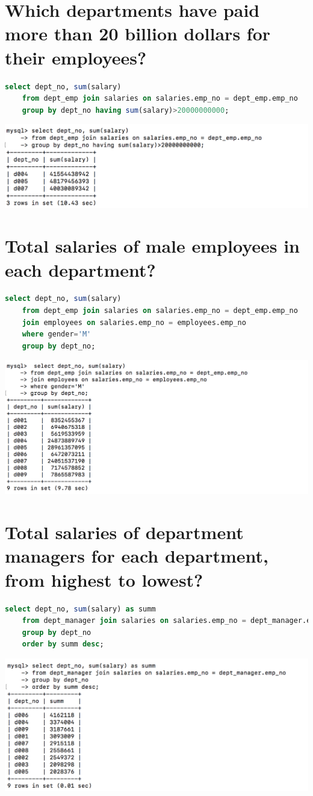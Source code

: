 \documentclass{article}
\begin{document}
\section{Which departments have paid more than 20 billion dollars for their employees?}
\begin{lstlisting}[language=sql]
select dept_no, sum(salary) 
	from dept_emp join salaries on salaries.emp_no = dept_emp.emp_no
	group by dept_no having sum(salary)>20000000000;
\end{lstlisting}
\includegraphics[width=\linewidth]{4.png}

\section{Total salaries of male employees in each department?}
\begin{lstlisting}[language=sql]
select dept_no, sum(salary) 
	from dept_emp join salaries on salaries.emp_no = dept_emp.emp_no
	join employees on salaries.emp_no = employees.emp_no
	where gender='M'
	group by dept_no;
\end{lstlisting}
\includegraphics[width=\linewidth]{5.png}

\section{Total salaries of department managers for each department,
from highest to lowest?}
\begin{lstlisting}[language=sql]
select dept_no, sum(salary) as summ
	from dept_manager join salaries on salaries.emp_no = dept_manager.emp_no
	group by dept_no 
	order by summ desc;
\end{lstlisting}
\includegraphics[width=\linewidth]{6.png}
\end{document}
